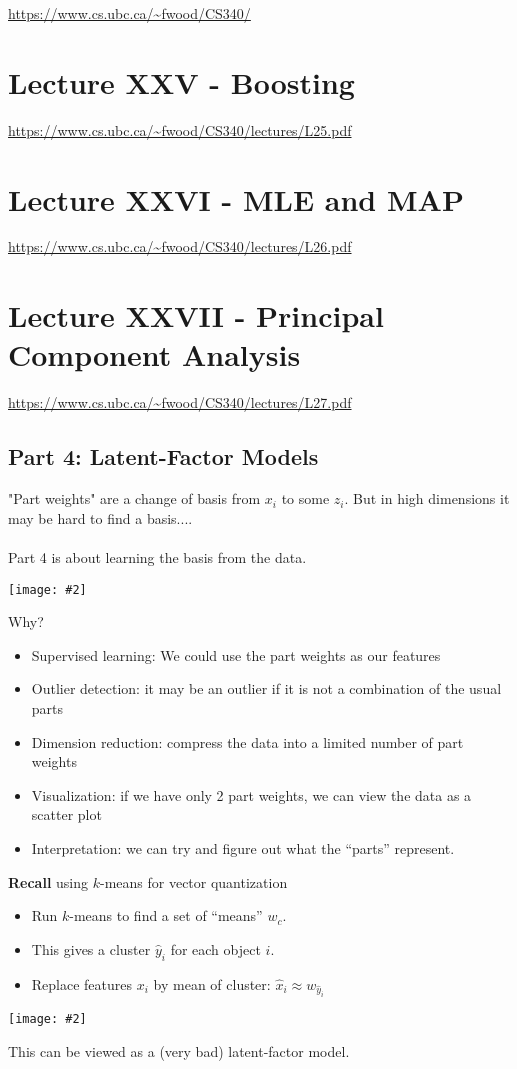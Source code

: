 \documentclass{article}
\def\blu#1{{\color{blu}#1}}
\def\gre#1{{\color{gre}#1}}
\def\red#1{{\color{red}#1}}
\newcommand{\centerfig}[2]{\begin{center}\texttt{[image: \#2]}\end{center}}
\begin{document}
\noindent \url{https://www.cs.ubc.ca/~fwood/CS340/}

\section*{Lecture XXV - Boosting}
\noindent \url{https://www.cs.ubc.ca/~fwood/CS340/lectures/L25.pdf}

\newpage
\section*{Lecture XXVI - MLE and MAP}
\noindent \url{https://www.cs.ubc.ca/~fwood/CS340/lectures/L26.pdf}


\newpage
\section*{Lecture XXVII - Principal Component Analysis}
\noindent \url{https://www.cs.ubc.ca/~fwood/CS340/lectures/L27.pdf}

\subsection*{Part 4: Latent-Factor Models}
\gre{"Part weights" are a change of basis} from $ x_i $ to some $ z_i $. But in high dimensions \red{it may be hard to find a basis}....\\
\\
Part 4 is about \blu{learning the basis from the data}. 
\centerfig{0.4}{lat-fac-1}
Why?
\begin{itemize}
	\item \blu{Supervised learning}: We could use the part weights as our features
	\item \blu{Outlier detection}: it may be an outlier if it is not a combination of the usual parts
	\item \blu{Dimension reduction}: compress the data into a limited number of part weights
	\item \blu{Visualization}: if we have only 2 part weights, we can view the data as a scatter plot
	\item \blu{Interpretation}: we can try and figure out what the “parts” represent.
\end{itemize}

\begin{siderules}
	\textbf{Recall} using \blu{$ k $-means for vector quantization}
	\begin{itemize}[label=-]
		\item Run $ k $-means to find a set of “means” $ w_c $.
		\item This gives a cluster $ \hat{y}_i $ for each object $ i $.
		\item Replace features $ x_i $ by mean of cluster: $ \hat{x}_i \approx w_{\hat{y}_i} $
	\end{itemize}
\centerfig{0.8}{lat-fac-2}
This \gre{can be viewed as a (very bad) latent-factor model}.
	\end{siderules}
\end{document}
